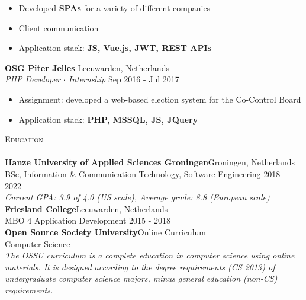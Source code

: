 \documentclass[a4paper]{article}
\newcommand{\lineunder} {
    \vspace*{-8pt} \\
    \hspace*{-18pt} \hrulefill \\
}
\newcommand{\header} [1] {
    {\hspace*{-18pt}\vspace*{6pt} \textsc{#1}}
    \vspace*{-6pt} \lineunder
}
\begin{document}
\vspace{-1mm}
\begin{itemize} \itemsep 1pt
	\item Developed \textbf{SPAs} for a variety of different companies
    \item Client communication
	\item Application stack: \textbf{JS, Vue.js, JWT, REST APIs}
\end{itemize}
\textbf{OSG Piter Jelles} \hfill Leeuwarden, Netherlands\\
\textit{PHP Developer $\cdot$ Internship} \hfill Sep 2016 - Jul 2017\\
\vspace{-1mm}
\begin{itemize} \itemsep 1pt
	\item Assignment: developed a web-based election system for the Co-Control Board
	\item Application stack: \textbf{PHP, MSSQL, JS, JQuery}
\end{itemize}

\vspace{5mm}

\header{Education}
\vspace{2mm}
\textbf{Hanze University of Applied Sciences Groningen}\hfill Groningen, Netherlands\\
BSc, Information \& Communication Technology, Software Engineering \hfill 2018 - 2022\\
\vspace{1mm}
\emph{Current GPA: 3.9 of 4.0 (US scale), Average grade: 8.8 (European scale)}\\
\vspace{2mm}
\textbf{Friesland College}\hfill Leeuwarden, Netherlands\\
MBO 4 Application Development \hfill 2015 - 2018\\
\vspace{2mm}
\textbf{Open Source Society University}\hfill Online Curriculum \\
Computer Science\\ 
\vspace{1mm}
\emph{The OSSU curriculum is a complete education in computer science using online materials. It is designed according to the degree requirements (CS 2013) of undergraduate computer science majors, minus general education (non-CS) requirements.}\\

\newpage
\end{document}
